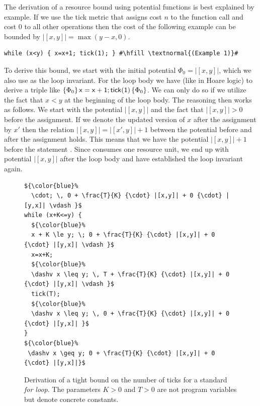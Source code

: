 \documentclass[nocopyrightspace,preprint,pldi]{sigplanconf-pldi15}
\begin{document}
The derivation of a resource bound using potential functions is best
explained by example.  If we use the tick metric that assigns cost $n$
to the function call  and cost $0$ to all other
operations then the cost of the following example can be bounded by
$|[x,y]| = \max(y{-}x,0)$.%
\begin{lstlisting}[basicstyle=\tt\small]
while (x<y) { x=x+1; tick(1); } #\hfill \textnormal{(Example 1)}#
\end{lstlisting}
To derive this bound, we start with the initial potential $\Phi_0 =
|[x,y]|$, which
we also use as the loop invariant.  For the loop body we have (like in
Hoare logic) to derive a triple like
$\{\Phi_0\}\, \mathsf{x=x+1;tick(1)}\, \{\Phi_0\}$.  We can only do so
if we utilize the fact that $x<y$ at the beginning of the loop body.
The reasoning then works as follows. We start with the potential
$|[x,y]|$ and the fact that $|[x,y]| > 0$ before the assignment.  If
we denote the updated version of $x$ after the assignment by $x'$ then
the relation $|[x,y]| = |[x',y]| + 1$ between the potential before and
after the assignment  holds.  This means that we have the
potential $|[x,y]| + 1$ before the statement .  Since
 consumes one resource unit, we end up with potential
$|[x,y]|$ after the loop body and have established the loop invariant
again.



\begin{figure}[t]
  \centering
\vspace{-1.5ex}
\begin{lstlisting}[mathescape]
${\color{blue}%
  \cdot; \, 0 + \frac{T}{K} {\cdot} |[x,y]| + 0 {\cdot} |[y,x]| \vdash }$
while (x+K<=y) {
  ${\color{blue}%
  x + K \le y; \; 0 + \frac{T}{K} {\cdot} |[x,y]| + 0 {\cdot} |[y,x]| \vdash }$
  x=x+K;
  ${\color{blue}%
  \dashv x \leq y; \, T + \frac{T}{K} {\cdot} |[x,y]| + 0 {\cdot} |[y,x]| \vdash }$
  tick(T);
  ${\color{blue}%
  \dashv x \leq y; \, 0 + \frac{T}{K} {\cdot} |[x,y]| + 0 {\cdot} |[y,x]| }$
}
${\color{blue}%
 \dashv x \geq y; 0 + \frac{T}{K} {\cdot} |[x,y]| + 0 {\cdot} |[y,x]|}$
\end{lstlisting}
  \caption{Derivation of a tight bound on the number of
    ticks for a standard \emph{for loop}.  The parameters $K>0$ and
    $T>0$ are not program variables but denote concrete constants.
  }
  \label{fig:ex1}
\end{figure}
\end{document}
